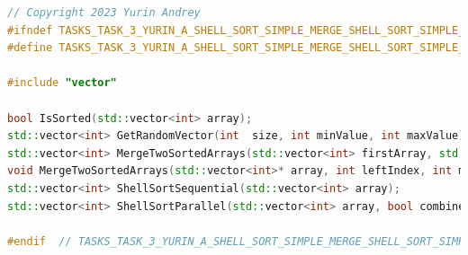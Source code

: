 \documentclass{report}
\begin{document}
\begin{lstlisting}[language=C++,caption=h файл]
// Copyright 2023 Yurin Andrey
#ifndef TASKS_TASK_3_YURIN_A_SHELL_SORT_SIMPLE_MERGE_SHELL_SORT_SIMPLE_MERGE_H_
#define TASKS_TASK_3_YURIN_A_SHELL_SORT_SIMPLE_MERGE_SHELL_SORT_SIMPLE_MERGE_H_

#include "vector"

bool IsSorted(std::vector<int> array);
std::vector<int> GetRandomVector(int  size, int minValue, int maxValue);
std::vector<int> MergeTwoSortedArrays(std::vector<int> firstArray, std::vector<int> secondArray);
void MergeTwoSortedArrays(std::vector<int>* array, int leftIndex, int midIndex, int rightIndex);
std::vector<int> ShellSortSequential(std::vector<int> array);
std::vector<int> ShellSortParallel(std::vector<int> array, bool combineInOneProcess = false);

#endif  // TASKS_TASK_3_YURIN_A_SHELL_SORT_SIMPLE_MERGE_SHELL_SORT_SIMPLE_MERGE_H_

\end{lstlisting}
\newpage
\end{document}
